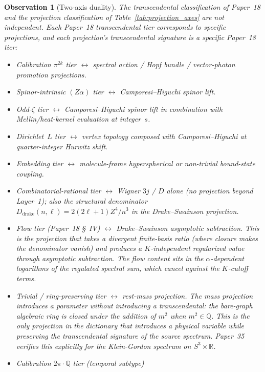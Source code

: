 \documentclass[11pt]{article}
\newtheorem{observation}{Observation}
\begin{document}
\begin{observation}[Two-axis duality]
\label{obs:duality}
The transcendental classification of Paper~18 and the projection
classification of Table~\ref{tab:projection_axes} are not independent.
Each Paper~18 transcendental tier corresponds to specific projections,
and each projection's transcendental signature is a specific Paper~18
tier:
\begin{itemize}\setlength\itemsep{0pt}
\item Calibration $\pi^{2k}$ tier $\leftrightarrow$ spectral action /
Hopf bundle / vector-photon promotion projections.
\item Spinor-intrinsic $(Z\alpha)$ tier $\leftrightarrow$
Camporesi--Higuchi spinor lift.
\item Odd-$\zeta$ tier $\leftrightarrow$ Camporesi--Higuchi spinor
lift in combination with Mellin/heat-kernel evaluation at integer~$s$.
\item Dirichlet~$L$ tier $\leftrightarrow$ vertex topology composed
with Camporesi--Higuchi at quarter-integer Hurwitz shift.
\item Embedding tier $\leftrightarrow$ molecule-frame hyperspherical
or non-trivial bound-state coupling.
\item Combinatorial-rational tier $\leftrightarrow$
Wigner $3j$ / $D$ alone (no projection beyond Layer~1); also the
structural denominator $D_{\text{drake}}(n,\ell) = 2(2\ell+1)Z^4/n^3$
in the Drake--Swainson projection.
\item Flow tier (Paper~18 \S~IV) $\leftrightarrow$ Drake--Swainson
asymptotic subtraction.  This is the projection that takes a
divergent finite-basis ratio (where closure makes the denominator
vanish) and produces a $K$-independent regularized value through
asymptotic subtraction.  The flow content sits in the
$\alpha$-dependent logarithms of the regulated spectral sum, which
cancel against the $K$-cutoff terms.
\item \emph{Trivial / ring-preserving tier} $\leftrightarrow$
rest-mass projection.  The mass projection introduces a parameter
without introducing a transcendental: the bare-graph algebraic
ring is closed under the addition of $m^2$ when $m^2 \in \mathbb{Q}$.
This is the only projection in the dictionary that introduces a
physical variable while preserving the transcendental signature of
the source spectrum.  Paper~35 verifies this explicitly for the
Klein-Gordon spectrum on $S^3 \times \mathbb{R}$.
\item \emph{Calibration $2\pi \cdot \mathbb{Q}$ tier (temporal subtype)}

\end{itemize}
\end{observation}
\end{document}
